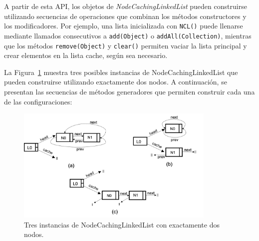 \noindent
A partir de esta API, los objetos de \emph{NodeCachingLinkedList} pueden construirse utilizando secuencias de operaciones que combinan los métodos constructores y los modificadores. Por ejemplo, una lista inicializada con \texttt{NCL()} puede llenarse mediante llamados consecutivos a \texttt{add(Object)} o \texttt{addAll(Collection)}, mientras que los métodos \texttt{remove(Object)} y \texttt{clear()} permiten vaciar la lista principal y crear elementos en la lista cache, según sea necesario.

La Figura~\ref{fig:ncl-instances-intro} muestra tres posibles instancias de NodeCachingLinkedList que pueden construirse utilizando exactamente dos nodos. A continuación, se presentan las secuencias de métodos generadores que permiten construir cada una de las configuraciones:


\begin{figure}[H]
    \centering
    \includegraphics[width=0.85\textwidth]{images/NCL-instances.png}
    \caption{Tres instancias de NodeCachingLinkedList con exactamente dos nodos.}
    \label{fig:ncl-instances-intro}
\end{figure}

